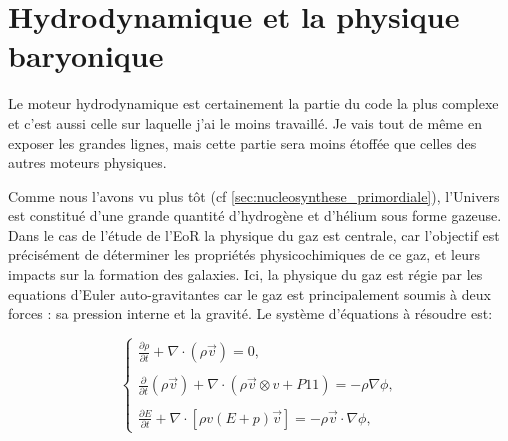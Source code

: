 %




\clearpage
\section{Hydrodynamique et la physique baryonique}
\label{sec:hydro}

Le moteur hydrodynamique est certainement la partie du code la plus complexe et c'est aussi celle sur laquelle j'ai le moins travaillé.
Je vais tout de même en exposer les grandes lignes, mais cette partie sera moins étoffée que celles des autres moteurs physiques.

Comme nous l'avons vu plus tôt (cf \ref{sec:nucleosynthese_primordiale}), l'Univers est constitué d'une grande quantité d'hydrogène et d'hélium sous forme gazeuse.
Dans le cas de l'étude de l'\ac{EoR} la physique du gaz est centrale, car l'objectif est précisément de déterminer les propriétés physicochimiques de ce gaz, et leurs impacts sur la formation des galaxies.
Ici, la physique du gaz est régie par les equations d'Euler auto-gravitantes car le gaz est principalement soumis à deux forces : sa pression interne et la gravité.
Le système d'équations à résoudre est:

\begin{equation}
\begin{cases}

{ \frac{ \partial \rho }{ \partial t } + \nabla \cdot (\rho \vec{v}) = 0}, \\
\\
{ \frac{ \partial }{ \partial t } (\rho \vec{v}) + \nabla \cdot (\rho \vec{v} \otimes v + P1\!\!1 )  = -\rho\nabla \phi }, \\
\\
{ \frac{ \partial E }{ \partial t } + \nabla \cdot [ \rho v (E+p)\vec{v} ] = -\rho \vec{v} \cdot \nabla \phi },

\end{cases}
\end{equation}
\label{eq:hydro}

